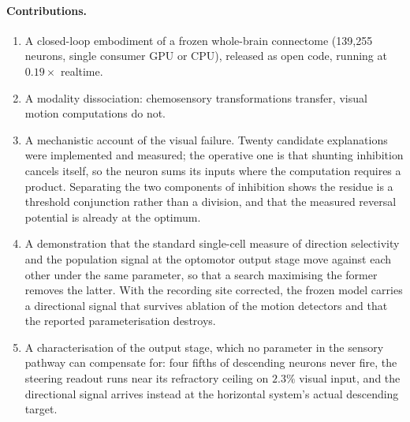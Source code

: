 \documentclass[10pt,twoside]{article}
\begin{document}
\paragraph{Contributions.}
\begin{enumerate}\itemsep2pt
\item A closed-loop embodiment of a frozen whole-brain connectome
(139{,}255 neurons, single consumer GPU or CPU), released as open code, running
at $0.19\times$ realtime.
\item A modality dissociation: chemosensory transformations transfer, visual
motion computations do not.
\item A mechanistic account of the visual failure. Twenty candidate
explanations were implemented and measured; the operative one is that shunting
inhibition cancels itself, so the neuron sums its inputs where the computation
requires a product. Separating the two components of inhibition shows the
residue is a threshold conjunction rather than a division, and that the
measured reversal potential is already at the optimum.

\item A demonstration that the standard single-cell measure of direction
selectivity and the population signal at the optomotor output stage move
against each other under the same parameter, so that a search maximising the
former removes the latter. With the recording site corrected, the frozen model
carries a directional signal that survives ablation of the motion detectors
and that the reported parameterisation destroys.

\item A characterisation of the output stage, which no parameter in the
sensory pathway can compensate for: four fifths of descending neurons never
fire, the steering readout runs near its refractory ceiling on $2.3\%$ visual
input, and the directional signal arrives instead at the horizontal system's
actual descending target.


\end{enumerate}
\end{document}
